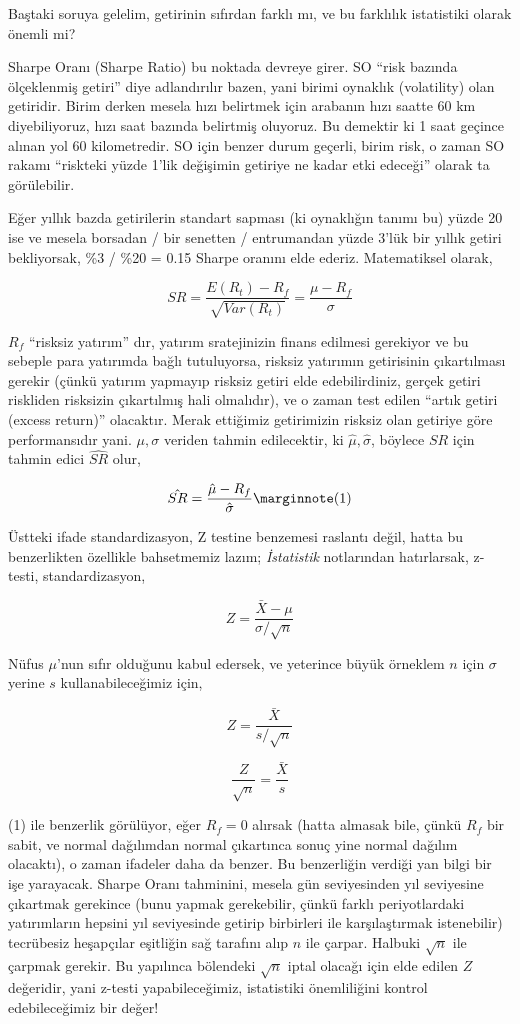 \documentclass[12pt,fleqn]{article}\usepackage{../../common}
\begin{document}
Baştaki soruya gelelim, getirinin sıfırdan farklı mı, ve bu farklılık
istatistiki olarak önemli mi?

Sharpe Oranı (Sharpe Ratio) bu noktada devreye girer. SO ``risk bazında
ölçeklenmiş getiri'' diye adlandırılır bazen, yani birimi oynaklık (volatility)
olan getiridir. Birim derken mesela hızı belirtmek için arabanın hızı saatte 60
km diyebiliyoruz, hızı saat bazında belirtmiş oluyoruz. Bu demektir ki 1 saat
geçince alınan yol 60 kilometredir. SO için benzer durum geçerli, birim risk, o
zaman SO rakamı ``riskteki yüzde 1'lik değişimin getiriye ne kadar etki
edeceği'' olarak ta görülebilir.

Eğer yıllık bazda getirilerin standart sapması (ki oynaklığın tanımı bu) yüzde
20 ise ve mesela borsadan / bir senetten / entrumandan yüzde 3'lük bir yıllık
getiri bekliyorsak, \%3 / \%20 = 0.15 Sharpe oranını elde ederiz. Matematiksel
olarak,

$$ SR = \frac{E(R_t) - R_f}{\sqrt{Var(R_t)}} = \frac{\mu - R_f}{\sigma} $$

$R_f$ ``risksiz yatırım'' dır, yatırım sratejinizin finans edilmesi
gerekiyor ve bu sebeple para yatırımda bağlı tutuluyorsa, risksiz yatırımın
getirisinin çıkartılması gerekir (çünkü yatırım yapmayıp risksiz getiri
elde edebilirdiniz, gerçek getiri riskliden risksizin çıkartılmış hali
olmalıdır), ve o zaman test edilen ``artık getiri (excess return)''
olacaktır. Merak ettiğimiz getirimizin risksiz olan getiriye göre
performansıdır yani. $\mu,\sigma$ veriden tahmin edilecektir, ki
$\hat{\mu},\hat{\sigma}$, böylece $SR$ için tahmin edici $\hat{SR}$ olur,

$$ 
\hat{SR} = \frac{\hat{\mu} - R_f}{\hat{\sigma}} 
\mlabel{1} 
$$

Üstteki ifade standardizasyon, Z testine benzemesi raslantı değil, hatta bu
benzerlikten özellikle bahsetmemiz lazım; {\em İstatistik} notlarından
hatırlarsak, z-testi, standardizasyon,

$$ Z = \frac{\bar{X} - \mu}{\sigma / \sqrt{n} } $$

Nüfus $\mu$'nun sıfır olduğunu kabul edersek, ve yeterince büyük örneklem
$n$ için $\sigma$ yerine $s$ kullanabileceğimiz için,

$$ Z = \frac{\bar{X}}{s / \sqrt{n} } $$

$$ \frac{Z}{\sqrt{n}} = \frac{\bar{X}}{s} $$

(1) ile benzerlik görülüyor, eğer $R_f=0$ alırsak (hatta almasak bile,
çünkü $R_f$ bir sabit, ve normal dağılımdan normal çıkartınca sonuç yine
normal dağılım olacaktı), o zaman ifadeler daha da benzer. Bu benzerliğin
verdiği yan bilgi bir işe yarayacak. Sharpe Oranı tahminini, mesela gün
seviyesinden yıl seviyesine çıkartmak gerekince (bunu yapmak gerekebilir,
çünkü farklı periyotlardaki yatırımların hepsini yıl seviyesinde getirip
birbirleri ile karşılaştırmak istenebilir) tecrübesiz heşapçılar eşitliğin
sağ tarafını alıp $n$ ile çarpar. Halbuki $\sqrt{n}$ ile çarpmak
gerekir. Bu yapılınca bölendeki $\sqrt{n}$ iptal olacağı için elde edilen
$Z$ değeridir, yani z-testi yapabileceğimiz, istatistiki önemliliğini
kontrol edebileceğimiz bir değer!
\end{document}
